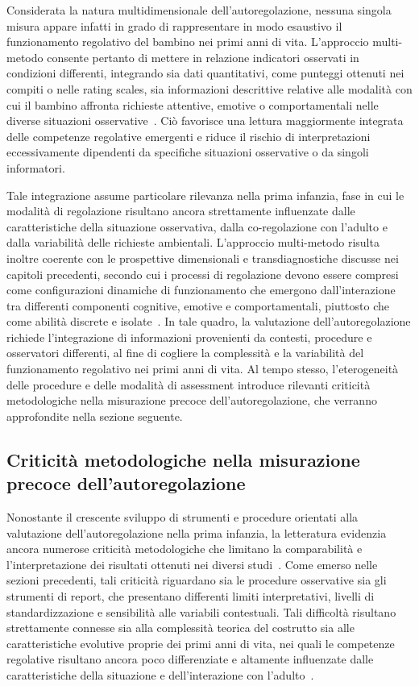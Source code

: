             Considerata la natura multidimensionale dell'autoregolazione, nessuna singola misura appare infatti in grado di rappresentare in modo esaustivo il funzionamento regolativo del bambino nei primi anni di vita. L'approccio multi-metodo consente pertanto di mettere in relazione indicatori osservati in condizioni differenti, integrando sia dati quantitativi, come punteggi ottenuti nei compiti o nelle rating scales, sia informazioni descrittive relative alle modalità con cui il bambino affronta richieste attentive, emotive o comportamentali nelle diverse situazioni osservative~\cite{mcclelland2012,duckworth2011}. Ciò favorisce una lettura maggiormente integrata delle competenze regolative emergenti e riduce il rischio di interpretazioni eccessivamente dipendenti da specifiche situazioni osservative o da singoli informatori.

            Tale integrazione assume particolare rilevanza nella prima infanzia, fase in cui le modalità di regolazione risultano ancora strettamente influenzate dalle caratteristiche della situazione osservativa, dalla co-regolazione con l'adulto e dalla variabilità delle richieste ambientali. L'approccio multi-metodo risulta inoltre coerente con le prospettive dimensionali e transdiagnostiche discusse nei capitoli precedenti, secondo cui i processi di regolazione devono essere compresi come configurazioni dinamiche di funzionamento che emergono dall'interazione tra differenti componenti cognitive, emotive e comportamentali, piuttosto che come abilità discrete e isolate~\cite{astle2022,beauchaine2019,nigg2017}. In tale quadro, la valutazione dell'autoregolazione richiede l'integrazione di informazioni provenienti da contesti, procedure e osservatori differenti, al fine di cogliere la complessità e la variabilità del funzionamento regolativo nei primi anni di vita. Al tempo stesso, l'eterogeneità delle procedure e delle modalità di assessment introduce rilevanti criticità metodologiche nella misurazione precoce dell'autoregolazione, che verranno approfondite nella sezione seguente.

        \subsection{Criticità metodologiche nella misurazione precoce dell'autoregolazione}
        \label{sec:3_5_4}

            Nonostante il crescente sviluppo di strumenti e procedure orientati alla valutazione dell'autoregolazione nella prima infanzia, la letteratura evidenzia ancora numerose criticità metodologiche che limitano la comparabilità e l'interpretazione dei risultati ottenuti nei diversi studi~\cite{berni2025,snyder2021}. Come emerso nelle sezioni precedenti, tali criticità riguardano sia le procedure osservative sia gli strumenti di report, che presentano differenti limiti interpretativi, livelli di standardizzazione e sensibilità alle variabili contestuali. Tali difficoltà risultano strettamente connesse sia alla complessità teorica del costrutto sia alle caratteristiche evolutive proprie dei primi anni di vita, nei quali le competenze regolative risultano ancora poco differenziate e altamente influenzate dalle caratteristiche della situazione e dell'interazione con l'adulto~\cite{garon2008}.

